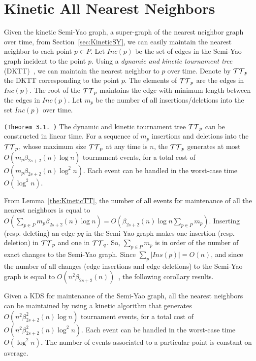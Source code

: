 \documentclass[11pt]{llncs}
\begin{document}
\section{Kinetic All Nearest Neighbors}\label{sec:KineticANN}
Given the kinetic Semi-Yao graph, a super-graph of the nearest neighbor graph over time, from Section~\ref{sec:KineticSY}, we can easily maintain the nearest neighbor to each point $p\in P$. Let $Inc(p)$ be the set of edges in the Semi-Yao graph incident to the point $p$.  Using a \textit{dynamic and kinetic tournament tree} (DKTT)~\cite{Agarwal:2008:KDD:1435375.1435379,Basch:1997:DSM:314161.314435}, we can maintain the nearest neighbor to $p$ over time. Denote by ${\cal TT}_p$ the DKTT corresponding to the point $p$. The elements of ${\cal TT}_p$ are the edges in $Inc(p)$. The root of the ${\cal TT}_p$ maintains the edge with minimum length between the edges in $Inc(p)$. Let $m_p$ be the number of all insertions/deletions into the set $Inc(p)$ over time. \begin{lemma}\label{the:KineticTT} {\tt (Theorem 3.1.~\cite{Agarwal:2008:KDD:1435375.1435379})}
The dynamic and kinetic tournament tree ${\cal TT}_p$ can be constructed in linear time. For a sequence of $m_p$ insertions and deletions into the ${\cal TT}_p$, whose maximum size ${\cal TT}_p$ at any time is $n$, the ${\cal TT}_p$ generates at most $O(m_p\beta_{2s+2}(n)\log n)$ tournament events, for a total cost of $O(m_p\beta_{2s+2}(n)\log^2 n)$. Each event can be handled in the worst-case time $O(\log^2 n)$.
\end{lemma}
From Lemma~\ref{the:KineticTT}, the number of all events for maintenance of all the nearest neighbors is equal to $O(\sum_{p\in P} m_p\beta_{2s+2}(n)\log n)=O(\beta_{2s+2}(n)\log n\sum_{p\in P} m_p)$. Inserting (resp. deleting) an edge $pq$ in the Semi-Yao graph makes one insertion (resp. deletion) in ${\cal TT}_p$ and one in ${\cal TT}_q$. So, $\sum_{p\in P} m_p$ is in order of the number of exact changes to the Semi-Yao graph. Since $\sum_p|Ins(p)|=O(n)$, and since the number of all changes (edge insertions and edge deletions) to the Semi-Yao graph is equal to $O(n^2\beta_{2s+2}(n))$~\cite{socg17-rahmati}, the following corollary results.
\begin{corollary}\label{the:KineticANN}
Given a KDS for  maintenance of the Semi-Yao graph, all the nearest neighbors can be maintained by using a kinetic algorithm that generates $O(n^2\beta_{2s+2}^2(n)\log n)$ tournament events, for a total cost of $O(n^2\beta_{2s+2}^2(n)\log^2 n)$. Each event can be handled in the worst-case time $O(\log^2 n)$. The number of events associated to a particular point is constant on average.
\end{corollary}
\end{document}
